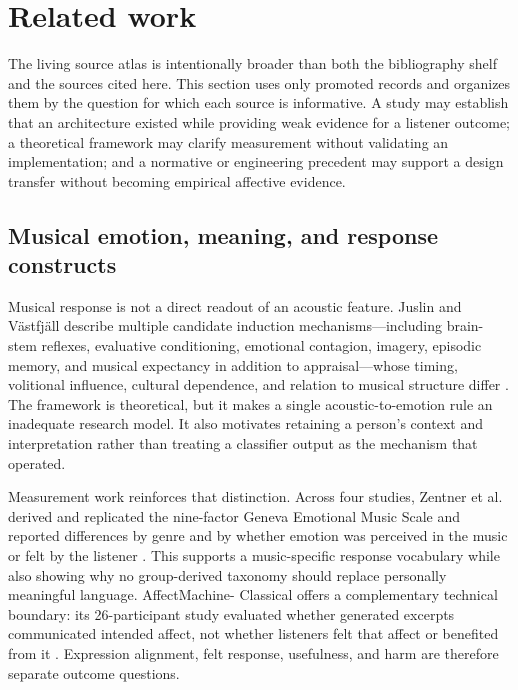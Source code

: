 \section{Related work}
\label{sec:related-work}

The living source atlas is intentionally broader than both the bibliography
shelf and the sources cited here. This section uses only promoted records and
organizes them by the question for which each source is informative. A study
may establish that an architecture existed while providing weak evidence for a
listener outcome; a theoretical framework may clarify measurement without
validating an implementation; and a normative or engineering precedent may
support a design transfer without becoming empirical affective evidence.

\subsection{Musical emotion, meaning, and response constructs}
\label{sec:related-musical-response}

Musical response is not a direct readout of an acoustic feature. Juslin and
V\"astfj\"all describe multiple candidate induction mechanisms---including
brain-stem reflexes, evaluative conditioning, emotional contagion, imagery,
episodic memory, and musical expectancy in addition to appraisal---whose
timing, volitional influence, cultural dependence, and relation to musical
structure differ \citep{juslin2008emotional}. The framework is theoretical,
but it makes a single acoustic-to-emotion rule an inadequate research model.
It also motivates retaining a person's context and interpretation rather than
treating a classifier output as the mechanism that operated.

Measurement work reinforces that distinction. Across four studies, Zentner
et al. derived and replicated the nine-factor Geneva Emotional Music Scale and
reported differences by genre and by whether emotion was perceived in the
music or felt by the listener \citep{zentner2008emotions}. This supports a
music-specific response vocabulary while also showing why no group-derived
taxonomy should replace personally meaningful language. AffectMachine-
Classical offers a complementary technical boundary: its 26-participant study
evaluated whether generated excerpts communicated intended affect, not whether
listeners felt that affect or benefited from it
\citep{agres2023affectmachine}. Expression alignment, felt response,
usefulness, and harm are therefore separate outcome questions.

